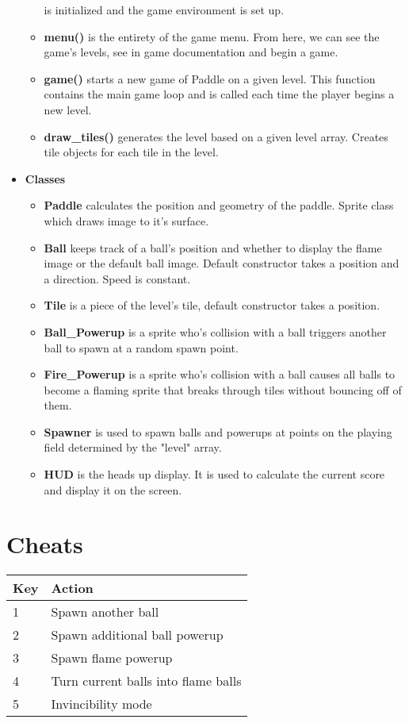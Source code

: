 \documentclass[11pt]{article}
\begin{document}
\begin{itemize}
\begin{itemize}
		is initialized and the game environment is set up.
		\item \textbf{menu()} is the entirety of the game menu. From here,
		we can see the game's levels, see in game documentation and begin
		a game.
		\item \textbf{game()} starts a new game of Paddle on a given level.
		This function contains the main game loop and is called each time
		the player begins a new level.
		\item \textbf{draw\_tiles()} generates the level based on a given
		level array. Creates tile objects for each tile in the level.
	\end{itemize}
	\item \textbf{Classes}
	\begin{itemize}
		\item \textbf{Paddle} calculates the position and geometry of the
		paddle. Sprite class which draws image to it's surface.
		\item \textbf{Ball} keeps track of a ball's position and whether to
		display the flame image or the default ball image. Default constructor
		takes a position and a direction. Speed is constant.
		\item \textbf{Tile} is a piece of the level's tile, default constructor
		takes a position.	
		\item \textbf{Ball\_Powerup} is a sprite who's collision with a ball
		triggers another ball to spawn at a random spawn point.
		\item \textbf{Fire\_Powerup} is a sprite who's collision with a ball causes
		all balls to become a flaming sprite that breaks through tiles without
		bouncing off of them.
		\item \textbf{Spawner} is used to spawn balls and powerups at points on the
		playing field determined by the "level" array.
		\item \textbf{HUD} is the heads up display. It is used to calculate
		the current score and display it on the screen. 			
	\end{itemize}
\end{itemize}

\section{Cheats}
\begin{tabular}{|l|l|}
\hline
\textbf{Key} & \textbf{Action}\\
\hline
1 & Spawn another ball\\
2 & Spawn additional ball powerup\\
3 & Spawn flame powerup\\
4 & Turn current balls into flame balls\\
5 & Invincibility mode\\
\hline
\end{tabular}
\end{document}
